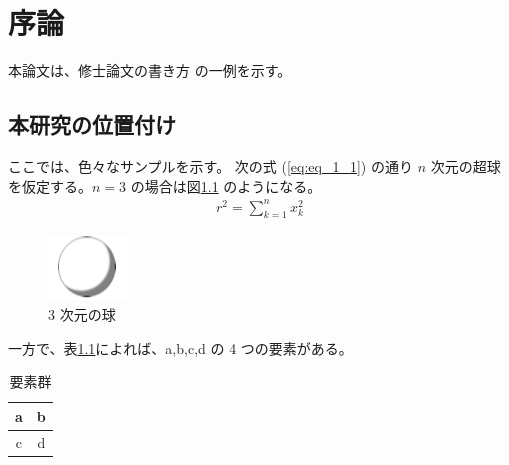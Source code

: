 \chapter{序論}

本論文は、修士論文の書き方 \cite{taro} の一例を示す。


\section{本研究の位置付け}

ここでは、色々なサンプルを示す。
次の式 (\ref{eq:eq_1_1}) の通り $n$ 次元の超球を仮定する。$n = 3$ の場合は図\ref{fig:ball} のようになる。
\begin{align}
	r^2 = \sum_{k=1}^n x_k^2
	\label{eq:eq_1_1}
\end{align}
\begin{figure}[h]
	\centering
	\includegraphics[bb=0 0 79 65]{./figures/ball.png}
	\caption{3 次元の球}
	\label{fig:ball}
\end{figure}

一方で、表\ref{table:elem}によれば、a,b,c,d の 4 つの要素がある。
\begin{table}[h]
	\centering
	\renewcommand{\tablename}{表}
	\begin{tabular}{|c|c|}
		\hline
		a & b \\ \hline
		c & d \\ \hline
	\end{tabular}
	\caption{要素群}
	\label{table:elem}
\end{table}


